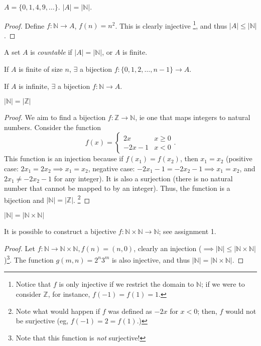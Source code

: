 \documentclass[12pt,oneside]{article}
\begin{document}
\begin{proposition}
  $A = \{0, 1, 4, 9, \dots\}$. $|A| = |\mathbb{N}|$.
\end{proposition}

\begin{proof}
  Define $f: \mathbb{N} \to A$, $f(n) = n^2$. This is clearly injective \footnote{Notice that $f$ is only injective if we restrict the domain to $\mathbb{N}$; if we were to consider $\mathbb{Z}$, for instance, $f(-1) = f(1) = 1$.}, and thus $|A| \leq |\mathbb{N}|$.
\end{proof}

\begin{definition}
  A set $A$ is \emph{countable} if $|A| = |\mathbb{N}|$, or $A$ is finite. 
  
  If $A$ is finite of size $n$, $\exists$ a bijection $f: \{0,1,2,\dots,n-1\} \to A$. 
  
  If $A$ is infinite, $\exists$ a bijection $f: \mathbb{N} \to A$.
\end{definition}

\begin{proposition}
  $|\mathbb{N}|=|\mathbb{Z}|$
\end{proposition}

\begin{proof}
  We aim to find a bijection $f: \mathbb{Z} \to \mathbb{N}$, ie one that maps integers to natural numbers. Consider the function \[f(x) = \begin{cases}
    2x & x \geq 0\\
    -2x-1 & x < 0
  \end{cases}.\]
  This function is an injection because if $f(x_1)=f(x_2)$, then $x_1 = x_2$ (positive case: $2x_1 = 2x_2 \implies x_1 = x_2$, negative case: $-2x_1-1 = -2x_2-1 \implies x_1 = x_2$, and $2x_1 \neq -2x_2 - 1$ for any integer). It is also a surjection (there is no natural number that cannot be mapped to by an integer). Thus, the function is a bijection and $|\mathbb{N}|=|\mathbb{Z}|$. \footnote{Note what would happen if $f$ was defined as $-2x$ for $x<0$; then, $f$ would not be surjective (eg, $f(-1) = 2 = f(1)$.)}
\end{proof}

\begin{proposition}
  $|\mathbb{N}|=|\mathbb{N}\times\mathbb{N}|$
\end{proposition}

\begin{remark}
  It is possible to construct a bijective $f: \mathbb{N} \times \mathbb{N} \to \mathbb{N}$; see assignment 1. %
\end{remark}
\begin{proof}
  Let $f: \mathbb{N} \to \mathbb{N} \times \mathbb{N}, f(n) = (n,0)$, clearly an injection ($\implies |\mathbb{N}| \leq |\mathbb{N} \times \mathbb{N}|$)\footnote{Note that this function is \textit{not} surjective!}. The function $g(m,n) = 2^n 3^m$ is also injective, and thus $|\mathbb{N}| = |\mathbb{N}\times\mathbb{N}|$.
\end{proof}
\end{document}
